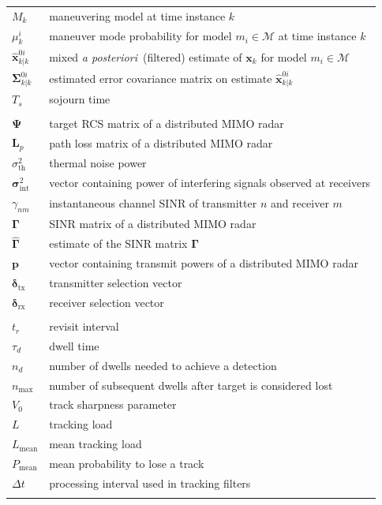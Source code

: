 \documentclass[english, 12pt, a4paper, elec, utf8, a-1b, online]{aaltothesis}
\renewcommand{\vec}[1]{\mathbf{#1}}
\newcommand{\x}{\vec{x}_k}
\newcommand{\modeprob}{\mu_k^i}
\newcommand{\xmxinitcurr}{\hat{\vec{x}}^{0i}_{k|k}}
\newcommand{\ecovmxinitcurr}{\bm{\Sigma}^{0i}_{k|k}}
\def\post{\textit{a posteriori}\ }
\newcommand{\mimm}{\mathcal{M}}
\newcommand{\dt}{\Delta t}
\newcommand{\thnoise}{\sigma^2_{\text{th}}}
\newcommand{\vpower}{\boldsymbol{p}}
\newcommand{\vintnoise}{\boldsymbol{\sigma}^2_{\text{int}}}
\newcommand{\esinr}{\gamma_{{nm}}}
\newcommand{\vsinrexp}{\boldsymbol{\Gamma}}
\newcommand{\vsinrb}{\widehat{\boldsymbol{\Gamma}}}
\newcommand{\vpl}{\vec{L}_p}
\newcommand{\vrcs}{\boldsymbol{\Psi}}
\newcommand{\vasvtx}{\boldsymbol{\delta}_{\text{tx}}}
\newcommand{\vasvrx}{\boldsymbol{\delta}_{\text{rx}}}
\newcommand{\ri}{t_r}
\begin{document}
\begin{longtable}{ll}
$M_k$ & maneuvering model at time instance $k$ \\
$\modeprob$ & maneuver mode probability for model $m_i \in \mimm$ at time instance $k$ \\
$\xmxinitcurr$ & mixed \post (filtered) estimate of $\x$ for model $m_i \in \mimm$\\
$\ecovmxinitcurr$ & estimated error covariance matrix on estimate $\xmxinitcurr$\\
$T_s$ & sojourn time \\
&\\
$\vrcs$ & target RCS matrix of a distributed MIMO radar \\
$\vpl$ & path loss matrix of a distributed MIMO radar\\
$\thnoise$ & thermal noise power \\
$\vintnoise$ & vector containing power of interfering signals observed at receivers \\
$\esinr$ & instantaneous channel SINR of transmitter $n$ and receiver $m$ \\
$\vsinrexp$ & SINR matrix of a distributed MIMO radar \\
$\vsinrb$ & estimate of the SINR matrix $\vsinrexp$ \\
$\vpower$ & vector containing transmit powers of a distributed MIMO radar \\
$\vasvtx$ & transmitter selection vector \\
$\vasvrx$ & receiver selection vector \\
&\\
$\ri$ & revisit interval \\
$\tau_d$ & dwell time \\
$n_d$ & number of dwells needed to achieve a detection \\
$n_\text{max}$ & number of subsequent dwells after target is considered lost \\
$V_0$ & track sharpness parameter \\
$L$ & tracking load \\
$L_\text{mean}$ & mean tracking load \\
$P_\text{mean}$ & mean probability to lose a track \\
$\dt$ & processing interval used in tracking filters \\
&\\

\end{longtable}
\end{document}
